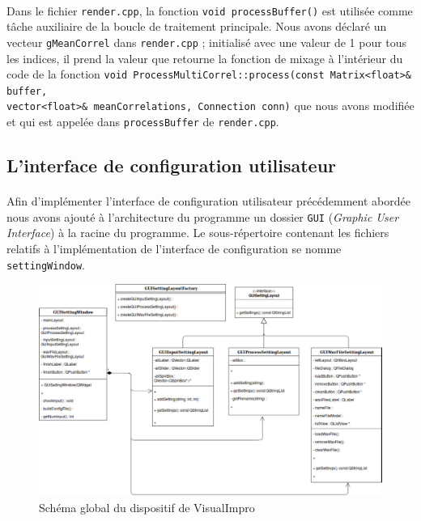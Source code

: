 \paragraph{}
Dans le fichier \verb!render.cpp!, la fonction
\verb!void processBuffer()! est utilisée comme tâche auxiliaire de la
boucle de traitement principale. Nous avons déclaré un vecteur
\verb!gMeanCorrel! dans \verb!render.cpp! ; initialisé avec une valeur
de 1 pour tous les indices, il prend la valeur que retourne la
fonction de mixage à l'intérieur du code de la fonction
\verb!void ProcessMultiCorrel::process(const Matrix<float>& buffer,! \\ \verb!vector<float>& meanCorrelations, Connection conn)!
que nous avons modifiée et qui est appelée dans \verb!processBuffer!
de \verb!render.cpp!.

\subsection{L'interface de configuration utilisateur}
\paragraph{}
Afin d'implémenter l'interface de configuration utilisateur précédemment abordée
nous avons ajouté à l'architecture du programme un dossier
\verb!GUI! (\textit{Graphic User Interface}) à la racine du programme.
Le sous-répertoire contenant les fichiers relatifs à l'implémentation de
l'interface de configuration se nomme \verb!settingWindow!.

\begin{figure}[h]
 \centering
 \includegraphics[scale=0.3]{umlSettingWindow.png}
 \caption{Schéma global du dispositif de VisualImpro}
 \label{schéma global}
\end{figure}


